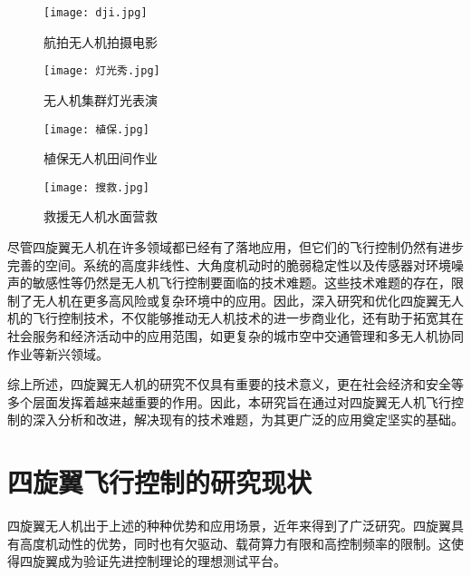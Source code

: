 \begin{figure}[htb]
    \centering
    \begin{minipage}[b]{0.49\linewidth}
        \texttt{[image: dji.jpg]}
        \caption{航拍无人机拍摄电影\protect\footnotemark[1]}
        \label{dji}
    \end{minipage}
    \hfill %
    \begin{minipage}[b]{0.49\linewidth}
        \texttt{[image: 灯光秀.jpg]}
        \caption{无人机集群灯光表演\protect\footnotemark[2]}
        \label{灯光秀}
    \end{minipage}


    \begin{minipage}[b]{0.49\linewidth}
        \texttt{[image: 植保.jpg]}
        \caption{植保无人机田间作业\protect\footnotemark[3]}
        \label{植保}
    \end{minipage}
    \hfill
    \begin{minipage}[b]{0.49\linewidth}
        \texttt{[image: 搜救.jpg]}
        \caption{救援无人机水面营救\protect\footnotemark[4]}
        \label{救援}
    \end{minipage}
\end{figure}
尽管四旋翼无人机在许多领域都已经有了落地应用，但它们的飞行控制仍然有进步完善的空间。系统的高度非线性、大角度机动时的脆弱稳定性以及传感器对环境噪声的敏感性等仍然是无人机飞行控制要面临的技术难题。这些技术难题的存在，限制了无人机在更多高风险或复杂环境中的应用。因此，深入研究和优化四旋翼无人机的飞行控制技术，不仅能够推动无人机技术的进一步商业化，还有助于拓宽其在社会服务和经济活动中的应用范围，如更复杂的城市空中交通管理和多无人机协同作业等新兴领域。

综上所述，四旋翼无人机的研究不仅具有重要的技术意义，更在社会经济和安全等多个层面发挥着越来越重要的作用。因此，本研究旨在通过对四旋翼无人机飞行控制的深入分析和改进，解决现有的技术难题，为其更广泛的应用奠定坚实的基础。
\section{四旋翼飞行控制的研究现状}
四旋翼无人机出于上述的种种优势和应用场景，近年来得到了广泛研究\cite{survey}。四旋翼具有高度机动性的优势，同时也有欠驱动、载荷算力有限和高控制频率的限制。这使得四旋翼成为验证先进控制理论的理想测试平台\cite{La2018}。
   

